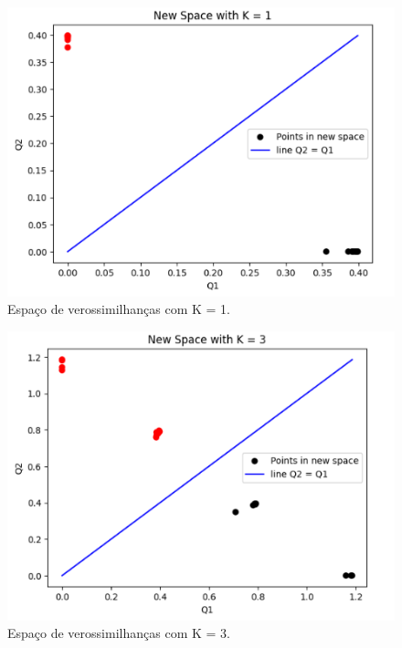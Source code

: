 \documentclass{article} %
\begin{document}
\newpage

\begin{figure}[h] %
    \centering %
    \includegraphics[width=1\linewidth]{k1.png} %
    \caption{Espaço de verossimilhanças com K = 1.} %
    \label{fig:exemplo} %
\end{figure}

\begin{figure}[h] %
    \centering %
    \includegraphics[width=1\linewidth]{k3.png} %
    \caption{Espaço de verossimilhanças com K = 3.} %
    \label{fig:exemplo} %
\end{figure}
\end{document}
